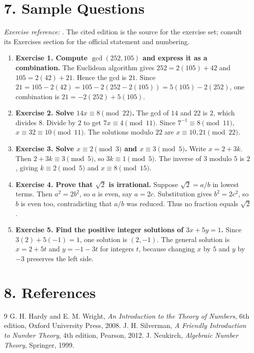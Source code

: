 \section*{7. Sample Questions}
\emph{Exercise reference:} \cite{number_theory_ref1}. The cited edition is the source for the exercise set; consult its Exercises section for the official statement and numbering.
\begin{enumerate}[leftmargin=*,itemsep=0.9em]
\item \textbf{Exercise 1. Compute $\gcd(252,105)$ and express it as a combination.} The Euclidean algorithm gives $252=2(105)+42$ and $105=2(42)+21$. Hence the gcd is $21$. Since $21=105-2(42)=105-2(252-2(105))=5(105)-2(252)$, one combination is $21=-2(252)+5(105)$.

\item \textbf{Exercise 2. Solve $14x\equiv8\pmod{22}$.} The gcd of $14$ and $22$ is $2$, which divides $8$. Divide by $2$ to get $7x\equiv4\pmod{11}$. Since $7^{-1}\equiv8\pmod{11}$, $x\equiv32\equiv10\pmod{11}$. The solutions modulo $22$ are $x\equiv10,21\pmod{22}$.

\item \textbf{Exercise 3. Solve $x\equiv2\pmod3$ and $x\equiv3\pmod5$.} Write $x=2+3k$. Then $2+3k\equiv3\pmod5$, so $3k\equiv1\pmod5$. The inverse of $3$ modulo $5$ is $2$, giving $k\equiv2\pmod5$ and $x\equiv8\pmod{15}$.

\item \textbf{Exercise 4. Prove that $\sqrt2$ is irrational.} Suppose $\sqrt2=a/b$ in lowest terms. Then $a^2=2b^2$, so $a$ is even, say $a=2c$. Substitution gives $b^2=2c^2$, so $b$ is even too, contradicting that $a/b$ was reduced. Thus no fraction equals $\sqrt2$.

\item \textbf{Exercise 5. Find the positive integer solutions of $3x+5y=1$.} Since $3(2)+5(-1)=1$, one solution is $(2,-1)$. The general solution is $x=2+5t$ and $y=-1-3t$ for integers $t$, because changing $x$ by $5$ and $y$ by $-3$ preserves the left side.

\end{enumerate}
\section*{8. References}
\begin{thebibliography}{9}
 G. H. Hardy and E. M. Wright, \emph{An Introduction to the Theory of Numbers}, 6th edition, Oxford University Press, 2008.
 J. H. Silverman, \emph{A Friendly Introduction to Number Theory}, 4th edition, Pearson, 2012.
 J. Neukirch, \emph{Algebraic Number Theory}, Springer, 1999.
\end{thebibliography}
